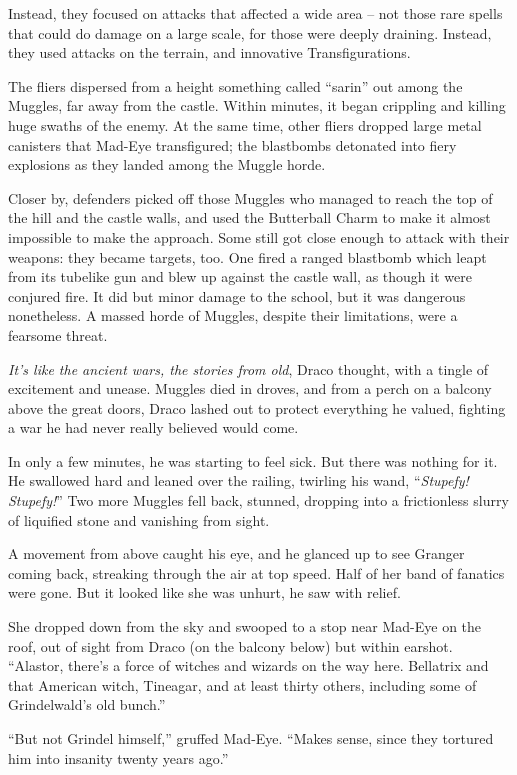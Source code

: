 Instead, they focused on attacks that affected a wide area -- not those
rare spells that could do damage on a large scale, for those were deeply
draining. Instead, they used attacks on the terrain, and innovative
Transfigurations.

The fliers dispersed from a height something called ``sarin'' out among
the Muggles, far away from the castle. Within minutes, it began
crippling and killing huge swaths of the enemy. At the same time, other
fliers dropped large metal canisters that Mad-Eye transfigured; the
blastbombs detonated into fiery explosions as they landed among the
Muggle horde.

Closer by, defenders picked off those Muggles who managed to reach the
top of the hill and the castle walls, and used the Butterball Charm to
make it almost impossible to make the approach. Some still got close
enough to attack with their weapons: they became targets, too. One fired
a ranged blastbomb which leapt from its tubelike gun and blew up against
the castle wall, as though it were conjured fire. It did but minor
damage to the school, but it was dangerous nonetheless. A massed horde
of Muggles, despite their limitations, were a fearsome threat.

\emph{It's like the ancient wars, the stories from old}, Draco thought,
with a tingle of excitement and unease. Muggles died in droves, and from
a perch on a balcony above the great doors, Draco lashed out to protect
everything he valued, fighting a war he had never really believed would
come.

In only a few minutes, he was starting to feel sick. But there was
nothing for it. He swallowed hard and leaned over the railing, twirling
his wand, ``\emph{Stupefy! Stupefy!}'' Two more Muggles fell back,
stunned, dropping into a frictionless slurry of liquified stone and
vanishing from sight.

A movement from above caught his eye, and he glanced up to see Granger
coming back, streaking through the air at top speed. Half of her band of
fanatics were gone. But it looked like she was unhurt, he saw with
relief.

She dropped down from the sky and swooped to a stop near Mad-Eye on the
roof, out of sight from Draco (on the balcony below) but within earshot.
``Alastor, there's a force of witches and wizards on the way here.
Bellatrix and that American witch, Tineagar, and at least thirty others,
including some of Grindelwald's old bunch.''

``But not Grindel himself,'' gruffed Mad-Eye. ``Makes sense, since they
tortured him into insanity twenty years ago.''


